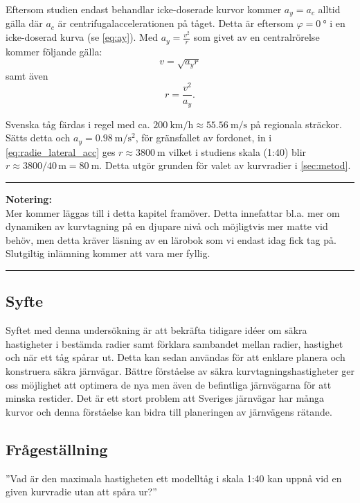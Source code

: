 Eftersom studien endast behandlar icke-doserade kurvor kommer $a_y=a_c$ alltid gälla där $a_c$ är centrifugalaccelerationen på tåget. Detta är eftersom $\varphi=\SI{0}{\degree}$ i en icke-doserad kurva (se \cref{eq:ay}). Med $a_y= \frac{v^2}{r}$ som givet av en centralrörelse kommer följande gälla:
\begin{equation}
    v=\sqrt{a_y r}
\end{equation}
samt även
\begin{equation}
    r=\frac{v^2}{a_y}.
    \label{eq:radie_lateral_acc}
\end{equation}

Svenska tåg färdas i regel med ca. $\SI{200}{\kilo\meter\per\hour} \approx \SI{55.56}{\m\per\s}$ på regionala sträckor. Sätts detta och $a_y=\SI{0.98}{\m\per\s\squared}$, för gränsfallet av fordonet, in i \cref{eq:radie_lateral_acc} ges $r\approx \SI{3800}{\m}$ vilket i studiens skala (1:40) blir $r\approx 3800/40\,\unit{\m} = \SI{80}{\m}$. Detta utgör grunden för valet av kurvradier i \cref{sec:metod}.

\begin{center}
    \hrule
    {\large\textbf{Notering:}} \\
    Mer kommer läggas till i detta kapitel framöver. Detta innefattar bl.a. mer om dynamiken av kurvtagning på en djupare nivå och möjligtvis mer matte vid behöv, men detta kräver läsning av en lärobok som vi endast idag fick tag på. Slutgiltig inlämning kommer att vara mer fyllig.
    \hrule
\end{center}

\subsection{Syfte}
Syftet med denna undersökning är att bekräfta tidigare idéer om säkra hastigheter i bestämda radier samt förklara sambandet mellan radier, hastighet och när ett tåg spårar ut. Detta kan sedan användas för att enklare planera och konstruera säkra järnvägar. Bättre förståelse av säkra kurvtagningshastigheter ger oss möjlighet att optimera de nya men även de befintliga järnvägarna för att minska restider. Det är ett stort problem att Sveriges järnvägar har många kurvor \parencite{} och denna förståelse kan bidra till planeringen av järnvägens rätande.

\subsection{Frågeställning}
''Vad är den maximala hastigheten ett modelltåg i skala 1:40 kan uppnå vid en given kurvradie utan att spåra ur?''

